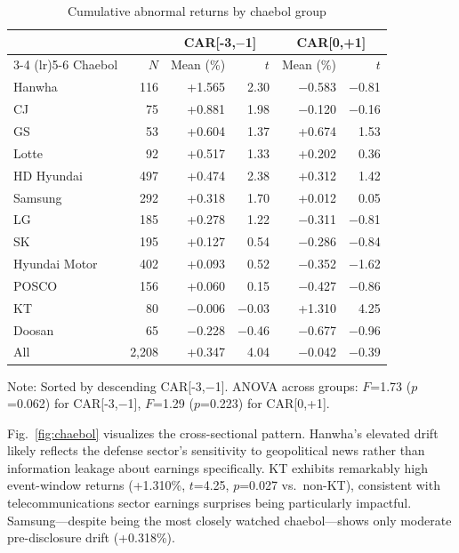 \documentclass[review,authoryear]{elsarticle}
\begin{document}
\begin{table}[ht]
\caption{Cumulative abnormal returns by chaebol group}
\label{tab:chaebol}
\begin{tabular}{lrrrrr}
\toprule
& & \multicolumn{2}{c}{CAR[-3,$-$1]} & \multicolumn{2}{c}{CAR[0,+1]} \\
\cmidrule(lr){3-4} \cmidrule(lr){5-6}
Chaebol & $N$ & Mean (\%) & $t$ & Mean (\%) & $t$ \\
\midrule
Hanwha & 116 & +1.565 & 2.30 & $-$0.583 & $-$0.81 \\
CJ & 75 & +0.881 & 1.98 & $-$0.120 & $-$0.16 \\
GS & 53 & +0.604 & 1.37 & +0.674 & 1.53 \\
Lotte & 92 & +0.517 & 1.33 & +0.202 & 0.36 \\
HD Hyundai & 497 & +0.474 & 2.38 & +0.312 & 1.42 \\
Samsung & 292 & +0.318 & 1.70 & +0.012 & 0.05 \\
LG & 185 & +0.278 & 1.22 & $-$0.311 & $-$0.81 \\
SK & 195 & +0.127 & 0.54 & $-$0.286 & $-$0.84 \\
Hyundai Motor & 402 & +0.093 & 0.52 & $-$0.352 & $-$1.62 \\
POSCO & 156 & +0.060 & 0.15 & $-$0.427 & $-$0.86 \\
KT & 80 & $-$0.006 & $-$0.03 & +1.310 & 4.25 \\
Doosan & 65 & $-$0.228 & $-$0.46 & $-$0.677 & $-$0.96 \\
\midrule
All & 2,208 & +0.347 & 4.04 & $-$0.042 & $-$0.39 \\
\bottomrule
\end{tabular}
\begin{flushleft}
\small Note: Sorted by descending CAR[-3,$-$1]. ANOVA across groups: $F$=1.73 ($p$=0.062) for CAR[-3,$-$1], $F$=1.29 ($p$=0.223) for CAR[0,+1].
\end{flushleft}
\end{table}

Fig.~\ref{fig:chaebol} visualizes the cross-sectional pattern. Hanwha's elevated drift likely reflects the defense sector's sensitivity to geopolitical news rather than information leakage about earnings specifically. KT exhibits remarkably high event-window returns (+1.310\%, $t$=4.25, $p$=0.027 vs.\ non-KT), consistent with telecommunications sector earnings surprises being particularly impactful. Samsung---despite being the most closely watched chaebol---shows only moderate pre-disclosure drift (+0.318\%).
\end{document}
